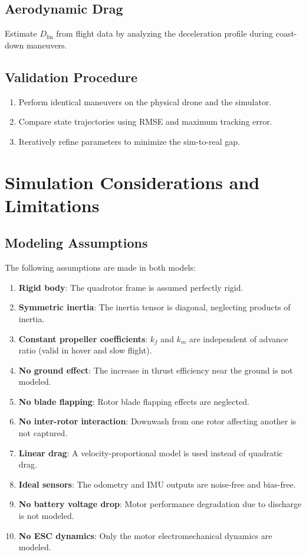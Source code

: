 \documentclass[journal]{IEEEtran}
\begin{document}
\subsection{Aerodynamic Drag}

Estimate $D_{\text{lin}}$ from flight data by analyzing the deceleration profile during coast-down maneuvers.

\subsection{Validation Procedure}

\begin{enumerate}
  \item Perform identical maneuvers on the physical drone and the simulator.
  \item Compare state trajectories using RMSE and maximum tracking error.
  \item Iteratively refine parameters to minimize the sim-to-real gap.
\end{enumerate}


\section{Simulation Considerations and Limitations}
\label{sec:considerations}

\subsection{Modeling Assumptions}

The following assumptions are made in both models:
\begin{enumerate}
  \item \textbf{Rigid body}: The quadrotor frame is assumed perfectly rigid.
  \item \textbf{Symmetric inertia}: The inertia tensor is diagonal, neglecting products of inertia.
  \item \textbf{Constant propeller coefficients}: $k_f$ and $k_m$ are independent of advance ratio (valid in hover and slow flight).
  \item \textbf{No ground effect}: The increase in thrust efficiency near the ground is not modeled.
  \item \textbf{No blade flapping}: Rotor blade flapping effects are neglected.
  \item \textbf{No inter-rotor interaction}: Downwash from one rotor affecting another is not captured.
  \item \textbf{Linear drag}: A velocity-proportional model is used instead of quadratic drag.
  \item \textbf{Ideal sensors}: The odometry and IMU outputs are noise-free and bias-free.
  \item \textbf{No battery voltage drop}: Motor performance degradation due to discharge is not modeled.
  \item \textbf{No ESC dynamics}: Only the motor electromechanical dynamics are modeled.
\end{enumerate}
\end{document}
